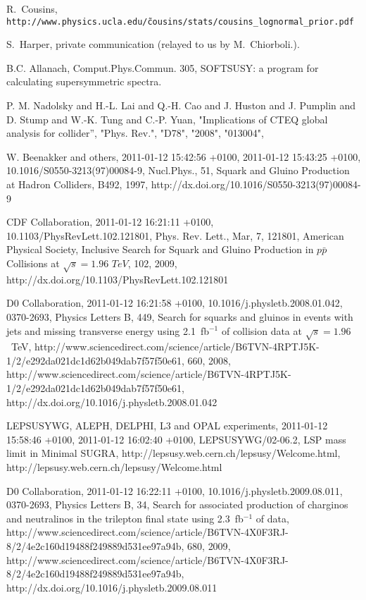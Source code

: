 \begin{thebibliography}{10}
 R.~Cousins, {\tt http://www.physics.ucla.edu/\~cousins/stats/cousins\_lognormal\_prior.pdf}

 S.~Harper, private communication (relayed to us by M.~Chiorboli.).

 B.C. Allanach, Comput.Phys.Commun. 305, SOFTSUSY: a program for calculating supersymmetric spectra.

      {P. M. Nadolsky and H.-L. Lai and Q.-H. Cao and J. Huston and J. Pumplin and D. Stump and W.-K. Tung and C.-P. Yuan},
      "Implications of CTEQ global analysis for collider'',
      "Phys. Rev.",
      "D78",
      "2008",
      "013004",

	{W. Beenakker and others},
	{2011-01-12 15:42:56 +0100},
	{2011-01-12 15:43:25 +0100},
	{10.1016/S0550-3213(97)00084-9},
	{Nucl.Phys.},
	{51},
	{Squark and Gluino Production at Hadron Colliders},
	{B492},
	{1997},
	{http://dx.doi.org/10.1016/S0550-3213(97)00084-9}

        {{CDF Collaboration}},
	{2011-01-12 16:21:11 +0100},
	{10.1103/PhysRevLett.102.121801},
	{Phys. Rev. Lett.},
	{Mar},
	{7},
	{121801},
	{American Physical Society},
	{Inclusive Search for Squark and Gluino Production in {$p\bar{p}$} Collisions at $\sqrt{s}=1.96\,\,TeV$},
	{102},
	{2009},
	{http://dx.doi.org/10.1103/PhysRevLett.102.121801}

	{{D0 Collaboration}},
	{2011-01-12 16:21:58 +0100},
	{10.1016/j.physletb.2008.01.042},
	{0370-2693},
	{Physics Letters B},
	{449},
	{Search for squarks and gluinos in events with jets and missing transverse energy using 2.1~fb{${}^{-1}$} of collision data at {$\sqrt{s}=1.96$}~TeV},
	{http://www.sciencedirect.com/science/article/B6TVN-4RPTJ5K-1/2/e292da021dc1d62b049dab7f57f50e61},
	{660},
	{2008},
	{http://www.sciencedirect.com/science/article/B6TVN-4RPTJ5K-1/2/e292da021dc1d62b049dab7f57f50e61},
	{http://dx.doi.org/10.1016/j.physletb.2008.01.042}

	{{LEPSUSYWG, ALEPH, DELPHI, L3 and OPAL experiments}},
	{2011-01-12 15:58:46 +0100},
	{2011-01-12 16:02:40 +0100},
	{LEPSUSYWG/02-06.2},
	{LSP mass limit in Minimal SUGRA},
	{http://lepsusy.web.cern.ch/lepsusy/Welcome.html},
	{http://lepsusy.web.cern.ch/lepsusy/Welcome.html}

	{{D0 Collaboration}},
	{2011-01-12 16:22:11 +0100},
	{10.1016/j.physletb.2009.08.011},
	{0370-2693},
	{Physics Letters B},
	{34},
	{Search for associated production of charginos and neutralinos in the trilepton final state using 2.3~fb{${}^{-1}$} of data},
	{http://www.sciencedirect.com/science/article/B6TVN-4X0F3RJ-8/2/4e2c160d19488f249889d531ee97a94b},
	{680},
	{2009},
	{http://www.sciencedirect.com/science/article/B6TVN-4X0F3RJ-8/2/4e2c160d19488f249889d531ee97a94b},
	{http://dx.doi.org/10.1016/j.physletb.2009.08.011}





\end{thebibliography}
